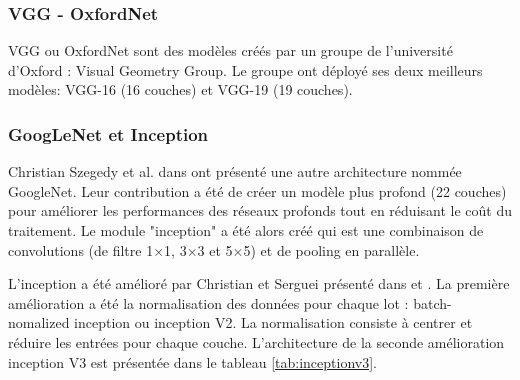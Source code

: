 \smallskip

\subsubsection{VGG - OxfordNet \cite{simonyan2014very}}
VGG ou OxfordNet sont des modèles créés par un groupe de l'université d'Oxford : Visual Geometry Group. Le groupe ont déployé ses deux meilleurs modèles: VGG-16 (16 couches) et VGG-19 (19 couches). \\
\smallskip

\subsubsection{GoogLeNet \cite{szegedy2015going} et Inception}
Christian Szegedy et al. dans \cite{szegedy2015going} ont présenté une autre architecture nommée GoogleNet. Leur contribution a été de créer un modèle plus profond (22 couches) pour améliorer les performances des réseaux profonds tout en réduisant le coût du traitement. Le module "inception" a été alors créé qui est une combinaison de convolutions (de filtre 1$\times$1, 3$\times$3 et 5$\times$5) et de pooling en parallèle.

 L'inception a été amélioré par Christian et Serguei présenté dans \cite{ioffe2015batch} et \cite{szegedy2015rethinking}. La première amélioration \cite{ioffe2015batch} a été la normalisation des données pour chaque lot : batch-nomalized inception ou inception V2. La normalisation consiste à centrer et réduire les entrées pour chaque couche. L'architecture de la seconde amélioration inception V3 \cite{szegedy2015rethinking}  est présentée dans le tableau \ref{tab:inceptionv3}. 

